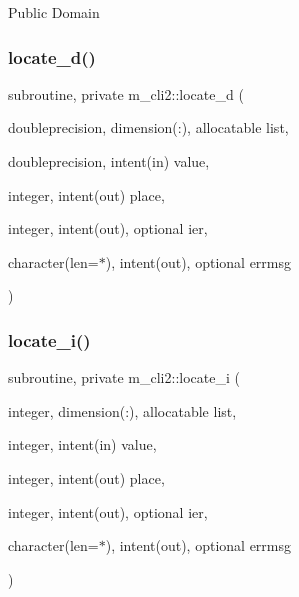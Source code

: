 Public Domain \mbox{\label{namespacem__cli2_a0e859cd8635ab617ea9a4e9b4ffca852}} 
\subsubsection{\texorpdfstring{locate\+\_\+d()}{locate\_d()}}
{\footnotesize\ttfamily subroutine, private m\+\_\+cli2\+::locate\+\_\+d (\begin{DoxyParamCaption}\item[{doubleprecision, dimension(\+:), allocatable}]{list,  }\item[{doubleprecision, intent(in)}]{value,  }\item[{integer, intent(out)}]{place,  }\item[{integer, intent(out), optional}]{ier,  }\item[{character(len=$\ast$), intent(out), optional}]{errmsg }\end{DoxyParamCaption})\hspace{0.3cm}{\ttfamily [private]}}

\mbox{\label{namespacem__cli2_a3cc41a1a629f9ab278376a71b243673d}} 
\subsubsection{\texorpdfstring{locate\+\_\+i()}{locate\_i()}}
{\footnotesize\ttfamily subroutine, private m\+\_\+cli2\+::locate\+\_\+i (\begin{DoxyParamCaption}\item[{integer, dimension(\+:), allocatable}]{list,  }\item[{integer, intent(in)}]{value,  }\item[{integer, intent(out)}]{place,  }\item[{integer, intent(out), optional}]{ier,  }\item[{character(len=$\ast$), intent(out), optional}]{errmsg }\end{DoxyParamCaption})\hspace{0.3cm}{\ttfamily [private]}}

\mbox{\label{namespacem__cli2_a2e12eb8c0ae6ce90b821141699e627df}} 
